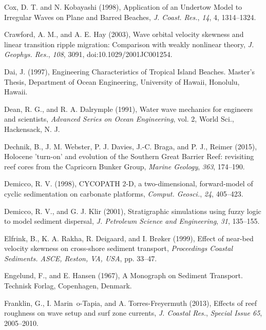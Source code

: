 \documentclass[default,jgrga]{agutex2015}
\begin{document}
\begin{article}
\begin{thebibliography}{}
Cox, D. T. and N. Kobayashi (1998), Application of an Undertow Model to Irregular Waves on Plane and Barred Beaches, \textit{J. Coast. Res.}, \textit{14}, 4, 1314--1324.

Crawford, A. M., and A. E. Hay (2003), Wave orbital velocity skewness and linear transition ripple migration: Comparison with weakly nonlinear theory, \textit{J. Geophys. Res.}, \textit{108}, 3091, doi:10.1029/2001JC001254.

Dai, J. (1997), Engineering Characteristics of Tropical Island Beaches. Master's Thesis, Department of Ocean Engineering, University of Hawaii, Honolulu, Hawaii.

Dean, R. G., and R. A. Dalrymple (1991), Water wave mechanics for engineers and scientists, \textit{Advanced Series on Ocean Engineering}, vol. 2, World Sci., Hackensack, N. J.

Dechnik, B., J. M. Webster, P. J. Davies, J.-C. Braga, and P. J., Reimer (2015), Holocene 'turn-on' and evolution of the Southern Great Barrier Reef: revisiting reef cores from the Capricorn Bunker Group, \textit{Marine Geology}, \textit{363}, 174--190.

Demicco, R. V. (1998), CYCOPATH 2-D, a two-dimensional, forward-model of cyclic sedimentation on carbonate platforms, \textit{Comput. Geosci.}, \textit{24}, 405--423.

Demicco, R. V., and G. J. Klir (2001), Stratigraphic simulations using fuzzy logic to model sediment dispersal, \textit{J. Petroleum Science and Engineering}, \textit{31}, 135--155.

Elfrink, B., K. A. Rakha, R. Deigaard, and I. Br{\o}ker (1999), Effect of near-bed velocity skewness on cross-shore sediment transport,  \textit{Proceedings Coastal Sediments. ASCE, Reston, VA, USA}, pp. 33--47.

Engelund, F., and E. Hansen (1967), A Monograph on Sediment Transport. Technisk Forlag, Copenhagen, Denmark.

Franklin, G., I. Marin~o-Tapia, and A. Torres-Freyermuth (2013), Effects of reef roughness on wave setup and surf zone currents, \textit{J. Coastal Res.}, \textit{Special Issue 65}, 2005--2010.


\end{thebibliography}
\end{article}
\end{document}
